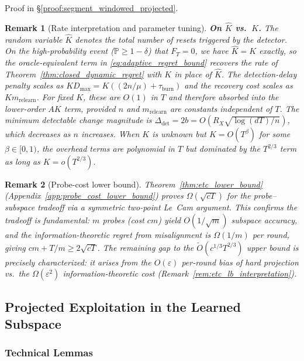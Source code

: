 \documentclass{article}
\newcommand{\Prob}{\mathbb{P}}
\newtheorem{remark}{Remark}
\begin{document}
Proof in \S\ref{proof:segment_windowed_projected}.

\begin{remark}[Rate interpretation and parameter tuning]
\label{rem:adaptive_rate_discussion}
\textbf{On $\hat K$ vs.\ $K$.}  The random variable $\hat K$ denotes the total number of resets triggered by the detector.  On the high-probability event ($\Prob \ge 1-\delta$) that $F_T = 0$, we have $\hat K = K$ exactly, so the oracle-equivalent term in \eqref{eq:adaptive_regret_bound} recovers the rate of Theorem~\ref{thm:closed_dynamic_regret} with $K$ in place of $\hat K$.  The detection-delay penalty scales as $K D_{\max} = K((2n/\mu) + \tau_{\mathrm{burn}})$ and the recovery cost scales as $K m_{\mathrm{relearn}}$.  For fixed $K$, these are $O(1)$ in $T$ and therefore absorbed into the lower-order $AK$ term, provided $n$ and $m_{\mathrm{relearn}}$ are constants independent of $T$.  The minimum detectable change magnitude is $\Delta_{\mathrm{det}} = 2b = O(R_X\sqrt{\log(dT)/n})$, which decreases as $n$ increases.  When $K$ is unknown but $K = O(T^\beta)$ for some $\beta \in [0, 1)$, the overhead terms are polynomial in $T$ but dominated by the $T^{2/3}$ term as long as $K = o(T^{2/3})$.
\end{remark}

\begin{remark}[Probe-cost lower bound]
\label{rem:lower_bound}
Theorem~\ref{thm:etc_lower_bound} (Appendix~\ref{app:probe_cost_lower_bound}) proves $\Omega(\sqrt{cT})$ for the probe--subspace tradeoff via a symmetric two-point Le~Cam argument.
This confirms the tradeoff is fundamental: $m$ probes (cost $cm$) yield $O(1/\sqrt{m})$ subspace accuracy, and the information-theoretic regret from misalignment is $\Omega(1/m)$ per round, giving $cm + T/m \ge 2\sqrt{cT}$.
The remaining gap to the $\widetilde O(c^{1/3}T^{2/3})$ upper bound is precisely characterized: it arises from the $O(\varepsilon)$ per-round bias of hard projection vs.\ the $\Omega(\varepsilon^2)$ information-theoretic cost (Remark~\ref{rem:etc_lb_interpretation}).
\end{remark}

\subsection{Projected Exploitation in the Learned Subspace}
\label{app:projected_exploitation}

\subsubsection{Technical Lemmas}
\end{document}
